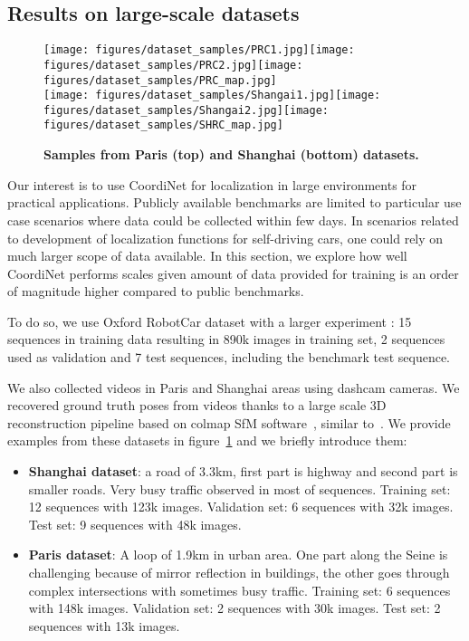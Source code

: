 \documentclass[10pt,twocolumn,letterpaper]{article}
\begin{document}
\subsection{Results on large-scale datasets}
\label{large_scale_experiments}

\begin{figure}[ht]
\centering

\texttt{[image: figures/dataset\_samples/PRC1.jpg]}\texttt{[image: figures/dataset\_samples/PRC2.jpg]}\texttt{[image: figures/dataset\_samples/PRC\_map.jpg]}\\

\texttt{[image: figures/dataset\_samples/Shangai1.jpg]}\texttt{[image: figures/dataset\_samples/Shangai2.jpg]}\texttt{[image: figures/dataset\_samples/SHRC\_map.jpg]}
   
   \caption{\textbf{Samples from Paris (top) and Shanghai (bottom) datasets.}\label{dataset_samples}}
\end{figure}

Our interest is to use CoordiNet for localization in large environments for practical applications. Publicly available benchmarks are limited to particular use case scenarios where data could be collected within few days. In scenarios related to development of localization functions for self-driving cars, one could rely on much larger scope of data available. In this section, we explore how well CoordiNet performs scales given amount of data provided for training is an order of magnitude higher compared to public benchmarks.

To do so, we use Oxford RobotCar dataset with a larger experiment : 15 sequences in training data resulting in 890k images in training set, 2 sequences used as validation and 7 test sequences, including the benchmark test sequence.

We also collected videos in Paris and Shanghai areas using dashcam cameras. We recovered ground truth poses from videos thanks to a large scale 3D reconstruction pipeline based on colmap SfM software~\cite{schoenberger2016sfm}, similar to~\cite{largescalesfm}. We provide examples from these datasets in figure~\ref{dataset_samples} and we briefly introduce them:

\begin{itemize}
    \item \textbf{Shanghai dataset}: a road of 3.3km, first part is highway and second part is smaller roads. Very busy traffic observed in most of sequences. Training set: 12 sequences with 123k images. Validation set: 6 sequences with 32k images. Test set: 9 sequences with 48k images.
    \item \textbf{Paris dataset}: A loop of 1.9km in urban area. One part along the Seine is challenging because of mirror reflection in buildings, the other goes through complex intersections with sometimes busy traffic. Training set: 6 sequences with 148k images. Validation set: 2 sequences with 30k images. Test set: 2 sequences with 13k images.
\end{itemize}
\end{document}
